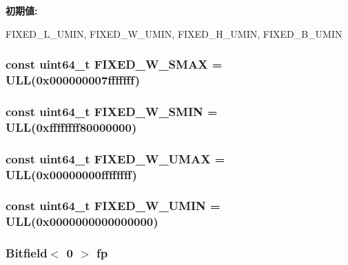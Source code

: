 \label{namespaceMipsISA_aeab1d8da14eb0f232765217502c593da}
{\bfseries 初期値:}
\begin{DoxyCode}

{ FIXED_L_UMIN, FIXED_W_UMIN, FIXED_H_UMIN, FIXED_B_UMIN }
\end{DoxyCode}
\hypertarget{namespaceMipsISA_a86dd8815bd57372a1040ba7cf4d30e28}{
\subsubsection[{FIXED\_\-W\_\-SMAX}]{\setlength{\rightskip}{0pt plus 5cm}const uint64\_\-t {\bf FIXED\_\-W\_\-SMAX} = ULL(0x000000007fffffff)}}
\label{namespaceMipsISA_a86dd8815bd57372a1040ba7cf4d30e28}
\hypertarget{namespaceMipsISA_a233a552996272d5c1b73f53d1ffd17de}{
\subsubsection[{FIXED\_\-W\_\-SMIN}]{\setlength{\rightskip}{0pt plus 5cm}const uint64\_\-t {\bf FIXED\_\-W\_\-SMIN} = ULL(0xffffffff80000000)}}
\label{namespaceMipsISA_a233a552996272d5c1b73f53d1ffd17de}
\hypertarget{namespaceMipsISA_a9fdc649ad8c150d9cb5969a6cef7b9af}{
\subsubsection[{FIXED\_\-W\_\-UMAX}]{\setlength{\rightskip}{0pt plus 5cm}const uint64\_\-t {\bf FIXED\_\-W\_\-UMAX} = ULL(0x00000000ffffffff)}}
\label{namespaceMipsISA_a9fdc649ad8c150d9cb5969a6cef7b9af}
\hypertarget{namespaceMipsISA_adabc2493e3927f0cbddbd225dbb192a3}{
\subsubsection[{FIXED\_\-W\_\-UMIN}]{\setlength{\rightskip}{0pt plus 5cm}const uint64\_\-t {\bf FIXED\_\-W\_\-UMIN} = ULL(0x0000000000000000)}}
\label{namespaceMipsISA_adabc2493e3927f0cbddbd225dbb192a3}
\hypertarget{namespaceMipsISA_a3233167b16e632eb21dbd7f259511ddd}{
\subsubsection[{fp}]{\setlength{\rightskip}{0pt plus 5cm}Bitfield$<$ 0 $>$ {\bf fp}}}
